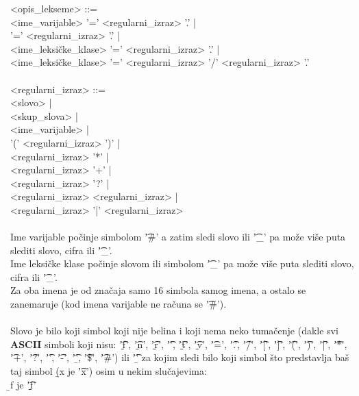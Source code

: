       {
        <opis\_lekseme> ::=\\
        \hs<ime\_varijable> '=' <regularni\_izraz> '.' |\\
        \hs '=' <regularni\_izraz> '.' |\\
        \hs<ime\_leksi\v cke\_klase> '=' <regularni\_izraz> '.' |\\
        \hs<ime\_leksi\v cke\_klase> '=' <regularni\_izraz> '/' <regularni\_izraz> '.' \\
        \\
        <regularni\_izraz> ::=\\
        \hs<slovo> |\\
        \hs<skup\_slova> |\\
        \hs<ime\_varijable> |\\
        \hs'(' <regularni\_izraz> ')' |\\
        \hs<regularni\_izraz> '*' |\\
        \hs<regularni\_izraz> '+' |\\
        \hs<regularni\_izraz> '?' |\\
        \hs<regularni\_izraz> <regularni\_izraz> |\\
        \hs<regularni\_izraz> '|' <regularni\_izraz> \\
      }\\
      Ime varijable po\v cinje simbolom \t{'\#'} a zatim sledi slovo ili
      \t{'\_'} pa mo\v ze vi\v se puta slediti slovo, cifra ili \t{'\_'}.\\
      Ime leksi\v cke klase po\v cinje slovom ili simbolom \t{'\_'} pa
      mo\v ze vi\v se puta slediti slovo, cifra ili \t{'\_'}.\\
      Za oba imena je od zna\v caja samo 16 simbola samog imena, a ostalo
      se zanemaruje (kod imena varijable ne ra\v cuna se \t{'\#'}).\\
      \\
      Slovo je bilo koji simbol koji nije belina i koji nema neko
      tuma\v cenje (dakle svi {\bf ASCII} simboli koji nisu: \t{'{\b}f'}, \t{'{\b}n'},
      \t{'{\b}r'}, \t{'\s'}, \t{'{\b}t'}, \t{'{\b}v'}, \t{'='}, \t{'.'},
      \t{'/'}, \t{'['}, \t{']'}, \t{'('}, \t{')'}, \t{'|'}, \t{'*'},
      \t{'+'}, \t{'?'}, \t{'\x'}, \t{'-'}, \t{'\b'}, \t{'\$'}, \t{'\#'})
      ili \t{'\b'} za kojim sledi bilo koji simbol \v sto predstavlja
      ba\v s taj simbol (\t{{\b}x} je \t{'x'}) osim u nekim slu\v cajevima:\\
      \hs\t{{\b}f} je \t{'{\b}f'}\\
